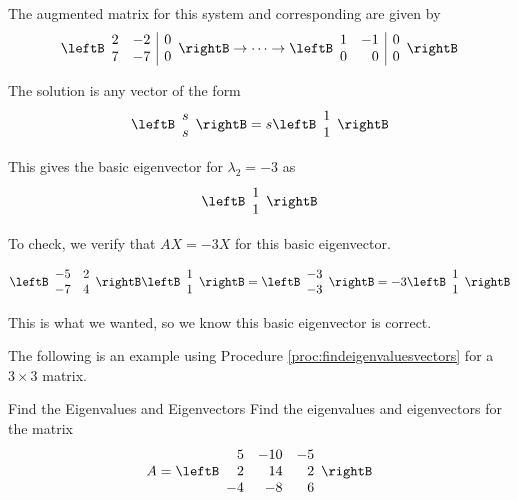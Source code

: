 \begin{solution}
The augmented matrix for this system and corresponding \rref \;are given by 
\[
\leftB \begin{array}{rr|r}
2 & -2 & 0 \\
7 & -7 & 0
\end{array}\rightB 
\rightarrow \cdots \rightarrow 
\leftB \begin{array}{rr|r}
1 & -1 & 0 \\
0 & 0 & 0 
\end{array} \rightB 
\]

The solution is any vector of the form
\[
\leftB \begin{array}{c}
s \\
s
\end{array} \rightB
=
s
\leftB \begin{array}{r}
1 \\
1
\end{array} \rightB
\]

This gives the basic eigenvector for $\lambda_2 = -3$ as 
\[
\leftB \begin{array}{r}
1\\
1
\end{array} \rightB
\]

To check, we verify that $AX = -3X$ for this basic eigenvector. 

\[
\leftB \begin{array}{rr}
-5 & 2 \\
-7 & 4
\end{array}\rightB 
\leftB \begin{array}{r}
1 \\
1
\end{array} \rightB
=
\leftB \begin{array}{r}
-3 \\
-3
\end{array}\rightB
=
-3
\leftB \begin{array}{r}
1\\
1
\end{array}
\rightB
\]

This is what we wanted, so we know this basic eigenvector is correct. 
\end{solution}

The following is an example using Procedure \ref{proc:findeigenvaluesvectors} for a $3 \times 3$ matrix. 

\begin{example}{Find the Eigenvalues and Eigenvectors}\label{exa:findeigenvectors}
Find the eigenvalues and eigenvectors for the matrix
\begin{equation*}
A=\leftB 
\begin{array}{rrr}
5 & -10 & -5 \\
2 & 14 & 2 \\
-4 & -8 & 6
\end{array}
\rightB 
\end{equation*}
\end{example}

